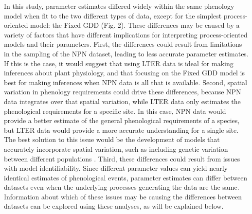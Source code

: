 \documentclass[fleqn,12pt,lineno]{article}
\begin{document}
In this study, parameter estimates differed widely within the same phenology model when fit to the two different types of data, except for the simplest process-oriented model: the Fixed GDD (Fig. 2). These differences may be caused by a variety of factors that have different implications for interpreting process-oriented models and their parameters. First, the differences could result from limitations in the sampling of the NPN dataset, leading to less accurate parameter estimates. If this is the case, it would suggest that using LTER data is ideal for making inferences about plant physiology, and that focusing on the Fixed GDD model is best for making inferences when NPN data is all that is available. Second, spatial variation in phenology requirements could drive these differences, because NPN data integrates over that spatial variation, while LTER data only estimates the phenological requirements for a specific site. In this case, NPN data would provide a better estimate of the general phenological requirements of a species, but LTER data would provide a more accurate understanding for a single site. The best solution to this issue would be the development of models that accurately incorporate spatial variation, such as including genetic variation between different populations \citep{chuine2017}. Third, these differences could result from issues with model identifiability. Since different parameter values can yield nearly identical estimates of phenological events, parameter estimates can differ between datasets even when the underlying processes generating the data are the same. Information about which of these issues may be causing the differences between datasets can be explored using these analyses, as will be explained below.
\end{document}
